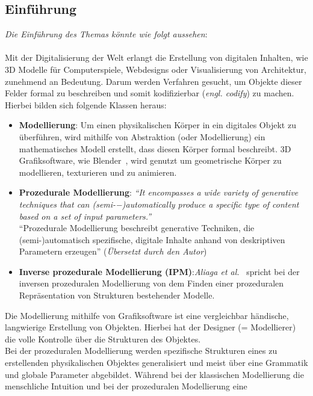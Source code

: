 \documentclass[11pt]{article}
\begin{document}
    \subsection{Einführung}
    \textit{Die Einführung des Themas könnte wie folgt aussehen}:\\~\\
    Mit der Digitalisierung der Welt erlangt die Erstellung von digitalen Inhalten, wie 3D Modelle für Computerspiele,
    Webdesigns oder Visualisierung von Architektur, zunehmend an Bedeutung.
    Darum werden Verfahren gesucht, um Objekte dieser Felder formal zu beschreiben und somit kodifizierbar
    (\textit{engl. codify}) zu machen.
    Hierbei bilden sich folgende Klassen heraus:
    \begin{itemize}
        \item \textbf{Modellierung}: Um einen physikalischen Körper in ein digitales Objekt zu überführen, wird mithilfe
        von Abstraktion (oder Modellierung) ein mathematisches Modell erstellt, dass diesen Körper formal beschreibt.
        3D Grafiksoftware, wie Blender~\cite{blender}, wird genutzt um geometrische Körper zu modellieren, texturieren
        und zu animieren.
        \item \textbf{Prozedurale Modellierung}: \textit{"`It encompasses a wide variety of generative techniques that
        can (semi-−)automatically produce a specific type of content based on a set of input
        parameters."'}~\cite{1} \\
        "`Prozedurale Modellierung beschreibt generative Techniken, die \\(semi-)automatisch spezifische, digitale
        Inhalte anhand von deskriptiven Parametern erzeugen"' (\textit{Übersetzt durch den Autor})
        \item \textbf{Inverse prozedurale Modellierung (IPM)}:\textit{Aliaga et al.}~\cite{2}
        spricht bei der inversen prozeduralen Modellierung von dem Finden einer prozeduralen Repräsentation von
        Strukturen bestehender Modelle.
    \end{itemize}
    Die Modellierung mithilfe von Grafiksoftware ist eine vergleichbar händische, langwierige Erstellung von
    Objekten.
    Hierbei hat der Designer (= Modellierer) die volle Kontrolle über die Strukturen des Objektes.\\
    Bei der prozeduralen Modellierung werden spezifische Strukturen eines zu erstellenden physikalischen Objektes
    generalisiert und meist über eine Grammatik und globale Parameter abgebildet.
    Während bei der klassischen Modellierung die menschliche Intuition und bei der prozeduralen Modellierung eine
\end{document}
